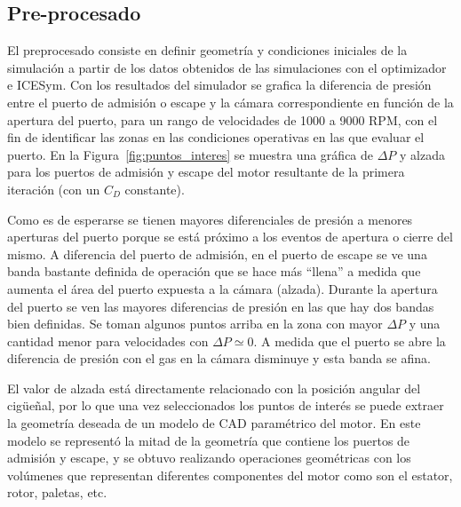 
\subsection{Pre-procesado}
%
El preprocesado consiste en definir geometría y condiciones iniciales de la
simulación a partir de los datos obtenidos de las simulaciones con el
optimizador e ICESym.
%
Con los resultados del simulador se grafica la diferencia de presión entre el
puerto de admisión o escape y la cámara correspondiente en función de la apertura
del puerto, para un rango de velocidades de 1000 a 9000 RPM, con el fin de
identificar las zonas en las condiciones operativas en las que evaluar el puerto.
%
En la Figura~\ref{fig:puntos_interes} se muestra una gráfica de $\Delta P$ y
alzada para los puertos de admisión y escape del motor resultante de la primera
iteración (con un $C_{D}$ constante).

Como es de esperarse se tienen mayores diferenciales de presión a menores
aperturas del puerto porque se está próximo a los eventos de apertura o cierre
del mismo.
%
A diferencia del puerto de admisión, en el puerto de escape se ve una banda
bastante definida de operación que se hace más ``llena'' a medida que aumenta el
área del puerto expuesta a la cámara (alzada).
%
Durante la apertura del puerto se ven las mayores diferencias de presión en las
que hay dos bandas bien definidas.
%
Se toman algunos puntos arriba en la zona con mayor $\Delta P$ y una cantidad
menor para velocidades con $\Delta P \simeq 0$.
%
A medida que el puerto se abre la diferencia de presión con el gas en la cámara
disminuye y esta banda se afina.


El valor de alzada está directamente relacionado con la posición angular del
cigüeñal, por lo que una vez seleccionados los puntos de interés se puede
extraer la geometría deseada de un modelo de CAD paramétrico del motor.
%
En este modelo se representó la mitad de la geometría que contiene los puertos
de admisión y escape, y se obtuvo realizando operaciones geométricas con los
volúmenes que representan diferentes componentes del motor como son el estator,
rotor, paletas, etc.
%

